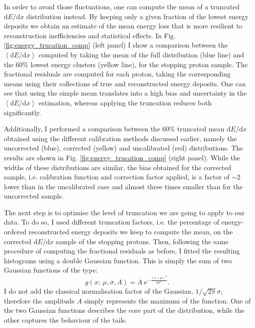 In order to avoid those fluctuations, one can compute the mean of a truncated $\mathrm{d}E/\mathrm{d}x$ distribution instead. By keeping only a given fraction of the lowest energy deposits we obtain an estimate of the mean energy loss that is more resilient to reconstruction inefficiencies and statistical effects. In Fig. \ref{fig:energy_trucation_comp} (left panel) I show a comparison between the $\left<\mathrm{d}E/\mathrm{d}x\right>$ computed by taking the mean of the full distribution (blue line) and the $60\%$ lowest energy clusters (yellow line), for the stopping proton sample. The fractional residuals are computed for each proton, taking the corresponding means using their collections of true and reconstructed energy deposits. One can see that using the simple mean translates into a high bias and uncertainty in the $\left<\mathrm{d}E/\mathrm{d}x\right>$ estimation, whereas applying the truncation reduces both significantly.

Additionally, I performed a comparison between the $60\%$ truncated mean $\mathrm{d}E/\mathrm{d}x$ obtained using the different calibration methods discussed earlier, namely the uncorrected (blue), corrected (yellow) and uncalibrated (red) distributions. The results are shown in Fig. \ref{fig:energy_trucation_comp} (right panel). While the widths of these distributions are similar, the bias obtained for the corrected sample, i.e. calibration function and correction factor applied, is a factor of $\sim2$ lower than in the uncalibrated case and almost three times smaller than for the uncorrected sample.

The next step is to optimise the level of truncation we are going to apply to our data. To do so, I used different truncation factors, i.e. the percentage of energy-ordered reconstructed energy deposits we keep to compute the mean, on the corrected $\mathrm{d}E/\mathrm{d}x$ sample of the stopping protons. Then, following the same procedure of computing the fractional residuals as before, I fitted the resulting histograms using a double Gaussian function. This is simply the sum of two Gaussian functions of the type:
\begin{equation}
	g(x;~\mu, \sigma, A) = A~\mathrm{e}^{-\frac{(x-\mu)^{2}}{2\sigma^{2}}}.
\end{equation}
I do not add the classical normalisation factor of the Gaussian, $1/\sqrt{2\pi}\sigma$, therefore the amplitude $A$ simply represents the maximum of the function. One of the two Gaussian functions describes the core part of the distribution, while the other captures the behaviour of the tails.

